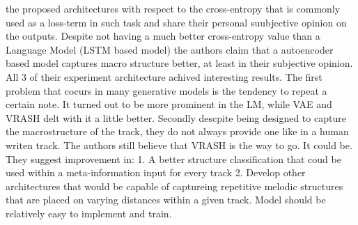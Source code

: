 the proposed architectures with respect to the cross-entropy that is commonly used as a loss-term in such task and share their personal suubjective opinion on the outputs. Despite not having a much better cross-entropy value than a Language Model (LSTM based model) the authors claim that a autoencoder based model captures macro structure better, at least in their subjective opinion. All 3 of their experiment architecture achived interesting results. The first problem that cocurs in many generative models is the tendency to repeat a certain note. It turned out to be more prominent in the LM, while VAE and VRASH delt with it a little better. Secondly descpite being designed to capture the macrostructure of the track, they do not always provide one like in a human writen track.  The authors still believe that VRASH is the way to go. It could be. They suggest improvement in: 1. A better structure classification that coud be used within a meta-information input for every track 2. Develop other architectures that would be capable of captureing repetitive melodic structures that are placed on varying distances within a given track. Model should be relatively easy to implement and train.

